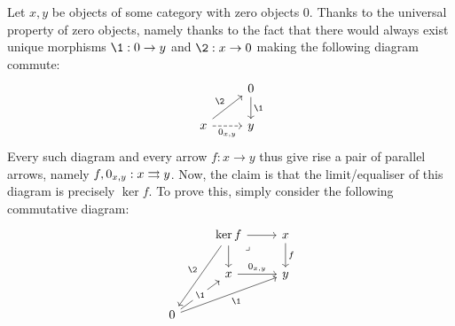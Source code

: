                     \begin{remark} \label{remark: (co)kernels_as_(co)equalisers}
                        Let $x, y$ be objects of some category with zero objects $0$. Thanks to the universal property of zero objects, namely thanks to the fact that there would always exist unique morphisms $\1: 0 \to y$ and $\2: x \to 0$ making the following diagram commute:
                            $$
                                \begin{tikzcd}
                                	{} & 0 \\
                                	x & y
                                	\arrow["{0_{x, y}}"', from=2-1, to=2-2, dashed]
                                	\arrow["\1", from=1-2, to=2-2]
                                	\arrow["\2", from=2-1, to=1-2]
                                \end{tikzcd}
                            $$
                        Every such diagram and every arrow $f: x \to y$ thus give rise a pair of parallel arrows, namely $f, 0_{x, y}: x \rightrightarrows y$. Now, the claim is that the limit/equaliser of this diagram is precisely $\ker f$. To prove this, simply consider the following commutative diagram:
                            $$
                                \begin{tikzcd}
                                	& {\ker f} & x \\
                                	& x & y \\
                                	0
                                	\arrow["f", from=1-3, to=2-3]
                                	\arrow[from=1-2, to=1-3]
                                	\arrow["\lrcorner"{anchor=center, pos=0.125}, draw=none, from=1-2, to=2-3]
                                	\arrow["{0_{x, y}}", from=2-2, to=2-3]
                                	\arrow[from=1-2, to=2-2]
                                	\arrow["\1"{description}, from=3-1, to=2-2]
                                	\arrow["\1"', from=3-1, to=2-3]
                                	\arrow["\2"', from=1-2, to=3-1]
                                \end{tikzcd}
                            $$
                    \end{remark}
                
